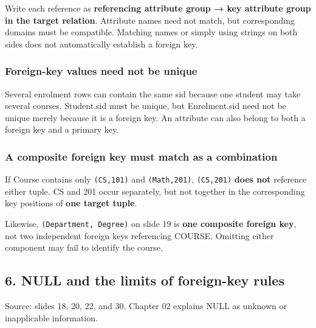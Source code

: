 Write each reference as \textbf{referencing attribute group → key attribute group in the target relation}. Attribute names need not match, but corresponding domains must be compatible. Matching names or simply using strings on both sides does not automatically establish a foreign key.

\subsubsection{Foreign-key values need not be unique}\label{03_relational_model_and_integrity_en-foreign-key-values-need-not-be-unique}

Several enrolment rows can contain the same sid because one student may take several courses. Student.sid must be unique, but Enrolment.sid need not be unique merely because it is a foreign key. An attribute can also belong to both a foreign key and a primary key.

\subsubsection{A composite foreign key must match as a combination}\label{03_relational_model_and_integrity_en-a-composite-foreign-key-must-match-as-a-combination}

If Course contains only \texttt{(\allowbreak{}CS,\allowbreak{}101)\allowbreak{}} and \texttt{(\allowbreak{}Math,\allowbreak{}201)\allowbreak{}}, \texttt{(\allowbreak{}CS,\allowbreak{}201)\allowbreak{}} \textbf{does not} reference either tuple. CS and 201 occur separately, but not together in the corresponding key positions of \textbf{one target tuple}.

Likewise, \texttt{(\allowbreak{}Department,\allowbreak{}\ Degree)\allowbreak{}} on slide 19 is \textbf{one composite foreign key}, not two independent foreign keys referencing COURSE. Omitting either component may fail to identify the course.

\subsection{6. NULL and the limits of foreign-key rules}\label{03_relational_model_and_integrity_en-null-and-the-limits-of-foreign-key-rules}

Source: slides 18, 20, 22, and 30. Chapter 02 explains NULL as unknown or inapplicable information.

